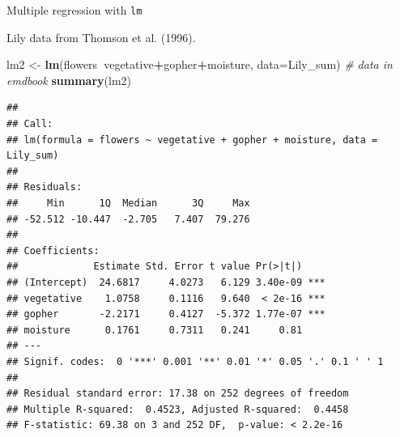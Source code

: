 \documentclass[
  ignorenonframetext,
]{beamer}
\newenvironment{Shaded}{\begin{snugshade}}{\end{snugshade}}
\newcommand{\CommentTok}[1]{\textcolor[rgb]{0.56,0.35,0.01}{\textit{#1}}}
\newcommand{\DataTypeTok}[1]{\textcolor[rgb]{0.13,0.29,0.53}{#1}}
\newcommand{\KeywordTok}[1]{\textcolor[rgb]{0.13,0.29,0.53}{\textbf{#1}}}
\newcommand{\NormalTok}[1]{#1}
\newcommand{\OperatorTok}[1]{\textcolor[rgb]{0.81,0.36,0.00}{\textbf{#1}}}
\newcommand{\StringTok}[1]{\textcolor[rgb]{0.31,0.60,0.02}{#1}}
\begin{document}
\begin{frame}[fragile]{Multiple regression with \texttt{lm}}
\protect\hypertarget{multiple-regression-with-lm}{}

Lily data from Thomson et al. (1996). \scriptsize

\begin{Shaded}
\begin{Highlighting}[]
\NormalTok{lm2 <-}\StringTok{ }\KeywordTok{lm}\NormalTok{(flowers}\OperatorTok{~}\NormalTok{vegetative}\OperatorTok{+}\NormalTok{gopher}\OperatorTok{+}\NormalTok{moisture, }\DataTypeTok{data=}\NormalTok{Lily_sum) }\CommentTok{# data in emdbook}
\KeywordTok{summary}\NormalTok{(lm2)}
\end{Highlighting}
\end{Shaded}

\begin{verbatim}
## 
## Call:
## lm(formula = flowers ~ vegetative + gopher + moisture, data = Lily_sum)
## 
## Residuals:
##     Min      1Q  Median      3Q     Max 
## -52.512 -10.447  -2.705   7.407  79.276 
## 
## Coefficients:
##             Estimate Std. Error t value Pr(>|t|)    
## (Intercept)  24.6817     4.0273   6.129 3.40e-09 ***
## vegetative    1.0758     0.1116   9.640  < 2e-16 ***
## gopher       -2.2171     0.4127  -5.372 1.77e-07 ***
## moisture      0.1761     0.7311   0.241     0.81    
## ---
## Signif. codes:  0 '***' 0.001 '**' 0.01 '*' 0.05 '.' 0.1 ' ' 1
## 
## Residual standard error: 17.38 on 252 degrees of freedom
## Multiple R-squared:  0.4523, Adjusted R-squared:  0.4458 
## F-statistic: 69.38 on 3 and 252 DF,  p-value: < 2.2e-16
\end{verbatim}

\end{frame}
\end{document}
